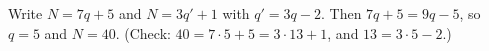 Write $N=7q+5$ and $N=3q'+1$ with $q'=3q-2$. Then $7q+5=9q-5$, so $q=5$ and $N=\boxed{40}$. (Check: $40=7\cdot5+5=3\cdot13+1$, and $13=3\cdot5-2$.)
